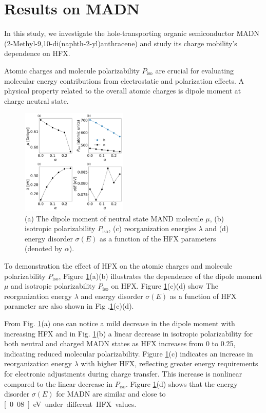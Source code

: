 \documentclass[%
 reprint,
superscriptaddress,
 amsmath,amssymb,
 aps,
prb,
floatfix
]{revtex4-2}
\begin{document}
\section{Results on MADN}

In this study, we investigate the hole-transporting organic semiconductor MADN (2-Methyl-9,10-di(naphth-2-yl)anthracene) and study its charge mobility's dependence on HFX. 

Atomic charges and molecule polarizability $P_\text{iso}$ are crucial for evaluating molecular energy contributions from electrostatic and polarization effects. A physical property related to the overall atomic charges is dipole moment at charge neutral state. 


%
\begin{figure}
    \centering
    \includegraphics[width=0.45\textwidth]{figs/fig_autogen.pdf}
    \caption{(a) The dipole moment of neutral state MAND molecule $\mu$, (b) isotropic polarizability $P_\text{iso}$, (c) reorganization energies $\lambda$ and (d) energy disorder $\sigma(E)$ as a function of the HFX parameters (denoted by $\alpha$).}
    \label{fig:autogen_MADN}
\end{figure}
% 

To demonstration the effect of HFX on the atomic charges and molecule polarizability $P_\text{iso}$,
Figure \ref{fig:autogen_MADN}(a)(b) illustrates the dependence of the dipole moment $\mu$ and isotropic polarizability $P_\text{iso}$ on HFX.
Figure \ref{fig:autogen_MADN}(c)(d) show 
The reorganization energy $\lambda$ and energy disorder $\sigma(E)$ as a function of HFX parameter are also shown in Fig .\ref{fig:autogen_MADN}(c)(d).

From Fig. \ref{fig:autogen_MADN}(a) one can notice a mild decrease in the dipole moment with increasing HFX and in Fig. \ref{fig:autogen_MADN}(b) a linear decrease in isotropic polarizability for both neutral and charged MADN states as HFX increases from 0 to 0.25, indicating reduced molecular polarizability.
Figure \ref{fig:autogen_MADN}(c) indicates an increase in reorganization energy $\lambda$ with higher HFX, reflecting greater energy requirements for electronic adjustments during charge transfer. This increase is nonlinear compared to the linear decrease in $P_\text{iso}$.
Figure \ref{fig:autogen_MADN}(d) shows that the energy disorder $\sigma(E)$ for MADN are similar and close to \unit[0.08]{eV} under different HFX values.
\end{document}
